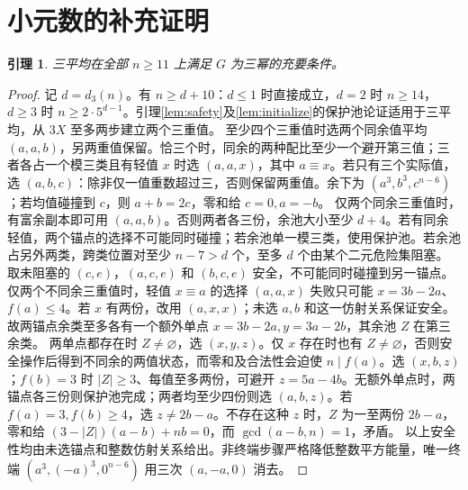 \documentclass[11pt,a4paper]{article}
\newtheorem{lemma}[theorem]{引理}
\theoremstyle{definition}
\numberwithin{equation}{section}
\begin{document}
\section{小元数的补充证明}
\begin{lemma}\label{lem:triple-large}
三平均在全部 $n\ge11$ 上满足 $G$ 为三幂的充要条件。
\end{lemma}
\begin{proof}
记 $d=d_3(n)$。有 $n\ge d+10$：$d\le1$ 时直接成立，$d=2$ 时 $n\ge14$，$d\ge3$ 时 $n\ge2\cdot5^{d-1}$。引理\ref{lem:safety}及\ref{lem:initialize}的保护池论证适用于三平均，从 $3X$ 至多两步建立两个三重值。
至少四个三重值时选两个同余值平均 $(a,a,b)$，另两重值保留。恰三个时，同余的两种配比至少一个避开第三值；三者各占一个模三类且有轻值 $x$ 时选 $(a,a,x)$，其中 $a\equiv x$。若只有三个实际值，选 $(a,b,c)$：除非仅一值重数超过三，否则保留两重值。余下为 $(a^3,b^3,c^{n-6})$；若均值碰撞到 $c$，则 $a+b=2c$，零和给 $c=0,a=-b$。
仅两个同余三重值时，有富余副本即可用 $(a,a,b)$。否则两者各三份，余池大小至少 $d+4$。若有同余轻值，两个锚点的选择不可能同时碰撞；若余池单一模三类，使用保护池。若余池占另外两类，跨类位置对至少 $n-7>d$ 个，至多 $d$ 个由某个二元危险集阻塞。取未阻塞的 $(c,e)$，$(a,c,e)$ 和 $(b,c,e)$ 安全，不可能同时碰撞到另一锚点。
仅两个不同余三重值时，轻值 $x\equiv a$ 的选择 $(a,a,x)$ 失败只可能 $x=3b-2a$、$f(a)\le4$。若 $x$ 有两份，改用 $(a,x,x)$；未选 $a,b$ 和这一仿射关系保证安全。故两锚点余类至多各有一个额外单点 $x=3b-2a,y=3a-2b$，其余池 $Z$ 在第三余类。
两单点都存在时 $Z\ne\varnothing$，选 $(x,y,z)$。仅 $x$ 存在时也有 $Z\ne\varnothing$，否则安全操作后得到不同余的两值状态，而零和及合法性会迫使 $n\mid f(a)$。选 $(x,b,z)$；$f(b)=3$ 时 $|Z|\ge3$、每值至多两份，可避开 $z=5a-4b$。无额外单点时，两锚点各三份则保护池完成；两者均至少四份则选 $(a,b,z)$。若 $f(a)=3,f(b)\ge4$，选 $z\ne2b-a$。不存在这种 $z$ 时，$Z$ 为一至两份 $2b-a$，零和给 $(3-|Z|)(a-b)+nb=0$，而 $\gcd(a-b,n)=1$，矛盾。
以上安全性均由未选锚点和整数仿射关系给出。非终端步骤严格降低整数平方能量，唯一终端 $(a^3,(-a)^3,0^{n-6})$ 用三次 $(a,-a,0)$ 消去。
\end{proof}
\end{document}
